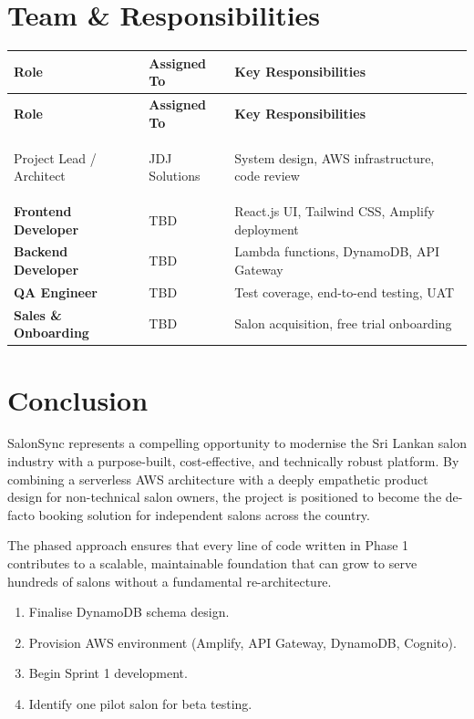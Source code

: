 \documentclass[12pt,a4paper]{report}
\begin{document}
\chapter{Team \& Responsibilities}

\begin{longtable}{>{\bfseries}p{4cm} p{4cm} p{6cm}}
  \toprule
  \textbf{Role} & \textbf{Assigned To} & \textbf{Key Responsibilities} \\
  \midrule
  \endfirsthead
  \toprule
  \textbf{Role} & \textbf{Assigned To} & \textbf{Key Responsibilities} \\
  \midrule
  \endhead
  \bottomrule
  \endfoot

  Project Lead / Architect  & JDJ Solutions     & System design, AWS infrastructure, code review \\[4pt]
  Frontend Developer         & TBD               & React.js UI, Tailwind CSS, Amplify deployment \\[4pt]
  Backend Developer          & TBD               & Lambda functions, DynamoDB, API Gateway \\[4pt]
  QA Engineer                & TBD               & Test coverage, end-to-end testing, UAT \\[4pt]
  Sales \& Onboarding        & TBD               & Salon acquisition, free trial onboarding \\
\end{longtable}

\chapter{Conclusion}

SalonSync represents a compelling opportunity to modernise the Sri Lankan salon
industry with a purpose-built, cost-effective, and technically robust platform.
By combining a serverless AWS architecture with a deeply empathetic product design
for non-technical salon owners, the project is positioned to become the de-facto
booking solution for independent salons across the country.

The phased approach ensures that every line of code written in Phase 1 contributes
to a scalable, maintainable foundation that can grow to serve hundreds of salons
without a fundamental re-architecture.

\begin{infobox}
\begin{enumerate}
  \item Finalise DynamoDB schema design.
  \item Provision AWS environment (Amplify, API Gateway, DynamoDB, Cognito).
  \item Begin Sprint 1 development.
  \item Identify one pilot salon for beta testing.
\end{enumerate}
\end{infobox}
\end{document}
